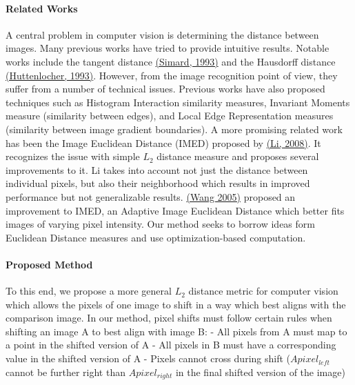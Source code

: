 \documentclass[11pt]{article}
\begin{document}
\hypertarget{related-works}{%
\paragraph{Related Works}\label{related-works}}

A central problem in computer vision is determining the distance between
images. Many previous works have tried to provide intuitive results.
Notable works include the tangent distance
\href{https://proceedings.neurips.cc/paper/1992/file/26408ffa703a72e8ac0117e74ad46f33-Paper.pdf}{(Simard,
1993)} and the Hausdorff distance
\href{https://people.eecs.berkeley.edu/~malik/cs294/Huttenlocher93.pdf}{(Huttenlocher,
1993)}. However, from the image recognition point of view, they suffer
from a number of technical issues. Previous works have also proposed
techniques such as Histogram Interaction similarity measures, Invariant
Moments measure (similarity between edges), and Local Edge
Representation measures (similarity between image gradient boundaries).
A more promising related work has been the Image Euclidean Distance
(IMED) proposed by
\href{https://ieeexplore.ieee.org/stamp/stamp.jsp?arnumber=1453520}{(Li,
2008)}. It recognizes the issue with simple \(L_2\) distance measure and
proposes several improvements to it. Li takes into account not just the
distance between individual pixels, but also their neighborhood which
results in improved performance but not generalizable results.
\href{https://www.sciencedirect.com/science/article/pii/S0031320308003130}{(Wang
2005)} proposed an improvement to IMED, an Adaptive Image Euclidean
Distance which better fits images of varying pixel intensity. Our method
seeks to borrow ideas form Euclidean Distance measures and use
optimization-based computation.

\hypertarget{proposed-method}{%
\paragraph{Proposed Method}\label{proposed-method}}

To this end, we propose a more general \(L_2\) distance metric for
computer vision which allows the pixels of one image to shift in a way
which best aligns with the comparison image. In our method, pixel shifts
must follow certain rules when shifting an image A to best align with
image B: - All pixels from A must map to a point in the shifted version
of A - All pixels in B must have a corresponding value in the shifted
version of A - Pixels cannot cross during shift (\(Apixel_{left}\)
cannot be further right than \(Apixel_{right}\) in the final shifted
version of the image)
\end{document}
